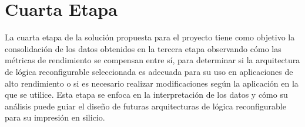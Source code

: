 \section{Cuarta Etapa}

La cuarta etapa de la solución propuesta para el proyecto tiene como objetivo la consolidación 
de los datos obtenidos en la tercera etapa observando cómo las métricas de rendimiento se 
compensan entre sí, para determinar si la arquitectura de lógica reconfigurable seleccionada 
es adecuada para su uso en aplicaciones de alto rendimiento o si es necesario realizar 
modificaciones según la aplicación en la que se utilice. Esta etapa se enfoca en la 
interpretación de los datos y cómo su análisis puede guiar el diseño de futuras arquitecturas 
de lógica reconfigurable para su impresión en silicio.